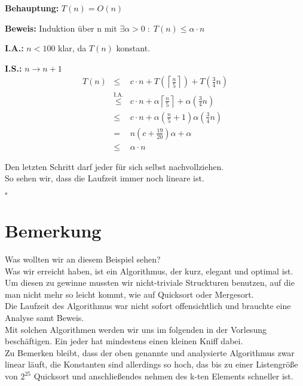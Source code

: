 \begin{description}

\item{\bfseries Behauptung:} $T(n) = O(n)$

\item{\bfseries Beweis:} Induktion über n mit $\exists \alpha > 0 \; : \; T(n) \leq \alpha \cdot n$

\begin{description}

\item{\bfseries I.A.:} $n<100$ klar, da $T(n)$ konstant.

\item{\bfseries I.S.:} $n \rightarrow n+1$\\

$$
\begin{array}{rcl}
T(n) &\leq& c \cdot n + T \left( \left\lceil \frac{n}{5} \right\rceil \right) + T \left( \frac{3}{4} n \right)\\
&\stackrel{\text{I.A.}}{\leq}& c\cdot n + \alpha \left\lceil \frac{n}{5} \right\rceil + \alpha \left( \frac{3}{4} n\right)\\
&\leq& c \cdot n + \alpha \left( \frac{n}{5} +1\right) \alpha \left( \frac{3}{4} n \right)\\
&=& n \left( c + \frac{19}{20} \right) \alpha + \alpha\\
&\leq& \alpha \cdot n
\end{array}
$$

Den letzten Schritt darf jeder für sich selbst nachvollziehen.\\
So sehen wir, dass die Laufzeit immer noch lineare ist.

\end{description}

\mbox{} \hfill $\square$

\end{description}

\section{Bemerkung}

Was wollten wir an diesem Beispiel sehen?\\
Was wir erreicht haben, ist ein Algorithmus, der kurz, elegant und optimal ist. Um diesen zu gewinne mussten wir nicht-triviale Struckturen benutzen, auf die man nicht mehr so leicht kommt, wie auf Quicksort oder Mergesort.\\
Die Laufzeit des Algorithmus war nicht sofort offensichtlich und brauchte eine Analyse samt Beweis.\vspace{\baselineskip}\\
Mit solchen Algorithmen werden wir uns im folgenden in der Vorlesung beschäftigen. Ein jeder hat mindestens einen kleinen Kniff dabei.\\
Zu Bemerken bleibt, dass der oben genannte und analysierte Algorithmus zwar linear läuft, die Konstanten sind allerdings so hoch, das bis zu einer Listengröße von $2^{25}$ Quicksort und anschließendes nehmen des k-ten Elements schneller ist.
